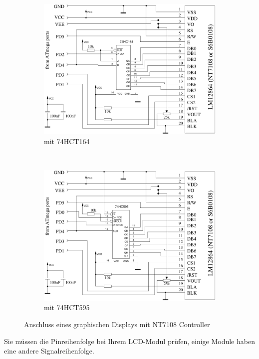 \begin{figure}[H]
  \begin{subfigure}[b]{.5\textwidth}	%
    \centering
    \includegraphics[width=.9\textwidth]{../FIG/ST7108serial164.pdf}	%
    \caption{mit 74HCT164}
  \end{subfigure}
  ~
  \begin{subfigure}[b]{.5\textwidth}	%
    \centering
    \includegraphics[width=.9\textwidth]{../FIG/ST7108serial595.pdf}	%
    \caption{mit 74HCT595}
  \end{subfigure}
  \caption{Anschluss eines graphischen Displays mit NT7108 Controller}
  \label{fig:NT7108lcd}
\end{figure}

Sie müssen die Pinreihenfolge bei Ihrem LCD-Modul prüfen, einige Module haben eine andere Signalreihenfolge.

